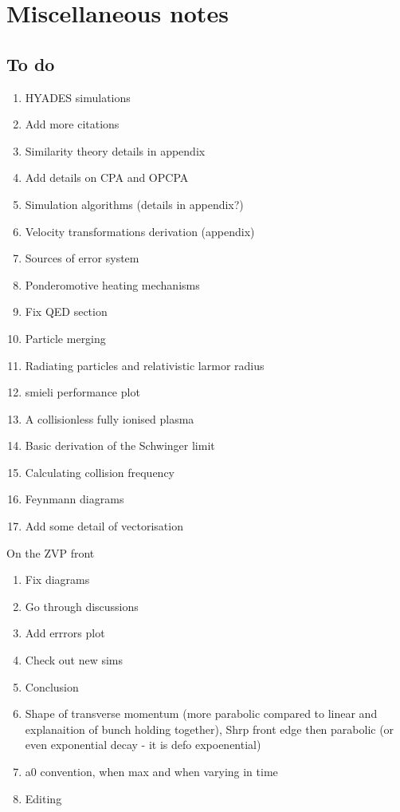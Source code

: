 \chapter{\label{ch:x-misc}Miscellaneous notes}

\minitoc

\section{To do}

\begin{enumerate}
	\item HYADES simulations
	\item Add more citations
	\item Similarity theory details in appendix
	\item Add details on CPA and OPCPA
	\item Simulation algorithms (details in appendix?)
	\item Velocity transformations derivation (appendix)
	\item Sources of error system
	\item Ponderomotive heating mechanisms
	\item Fix QED section
	\item Particle merging
	\item Radiating particles and relativistic larmor radius
	\item smieli performance plot
	\item A collisionless fully ionised plasma
	\item Basic derivation of the Schwinger limit
	\item Calculating collision frequency
	\item Feynmann diagrams
	\item Add some detail of vectorisation
\end{enumerate}

On the ZVP front
\begin{enumerate}
	\item Fix diagrams
	\item Go through discussions
	\item Add errrors plot
	\item Check out new sims
	\item Conclusion
	\item Shape of transverse momentum (more parabolic compared to linear and explanaition of bunch holding together), Shrp front edge then parabolic (or even exponential decay - it is defo expoenential)
	\item a0 convention, when max and when varying in time
	\item Editing
\end{enumerate}

